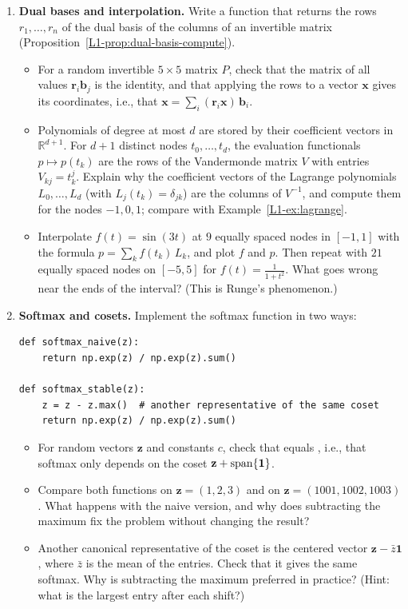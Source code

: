 \begin{enumerate}[label=\textbf{P\arabic*.}, leftmargin=*]
    \item \homework{} \textbf{Dual bases and interpolation.} Write a function  that returns the rows $r_1, \ldots, r_n$ of the dual basis of the columns of an invertible matrix  (Proposition~\ref{L1-prop:dual-basis-compute}).
    \begin{itemize}
        \item For a random invertible $5 \times 5$ matrix $P$, check that the matrix of all values $\mathbf{r}_i \mathbf{b}_j$ is the identity, and that applying the rows to a vector $\mathbf{x}$ gives its coordinates, i.e., that $\mathbf{x} = \sum_i (\mathbf{r}_i \mathbf{x})\, \mathbf{b}_i$.
        \item Polynomials of degree at most $d$ are stored by their coefficient vectors in $\mathbb{R}^{d+1}$. For $d + 1$ distinct nodes $t_0, \ldots, t_d$, the evaluation functionals $p \mapsto p(t_k)$ are the rows of the Vandermonde matrix $V$ with entries $V_{kj} = t_k^j$. Explain why the coefficient vectors of the Lagrange polynomials $L_0, \ldots, L_d$ (with $L_j(t_k) = \delta_{jk}$) are the columns of $V^{-1}$, and compute them for the nodes $-1, 0, 1$; compare with Example~\ref{L1-ex:lagrange}.
        \item Interpolate $f(t) = \sin(3t)$ at $9$ equally spaced nodes in $[-1, 1]$ with the formula $p = \sum_k f(t_k)\, L_k$, and plot $f$ and $p$. Then repeat with $21$ equally spaced nodes on $[-5, 5]$ for $f(t) = \frac{1}{1 + t^2}$. What goes wrong near the ends of the interval? (This is Runge's phenomenon.)
    \end{itemize}

    \item \textbf{Softmax and cosets.} Implement the softmax function in two ways:
\begin{lstlisting}
def softmax_naive(z):
    return np.exp(z) / np.exp(z).sum()

def softmax_stable(z):
    z = z - z.max()  # another representative of the same coset
    return np.exp(z) / np.exp(z).sum()
\end{lstlisting}
    \begin{itemize}
        \item For random vectors $\mathbf{z}$ and constants $c$, check that  equals , i.e., that softmax only depends on the coset $\mathbf{z} + \operatorname{span}\{\mathbf{1}\}$.
        \item Compare both functions on $\mathbf{z} = (1, 2, 3)$ and on $\mathbf{z} = (1001, 1002, 1003)$. What happens with the naive version, and why does subtracting the maximum fix the problem without changing the result?
        \item Another canonical representative of the coset is the centered vector $\mathbf{z} - \bar{z}\mathbf{1}$, where $\bar{z}$ is the mean of the entries. Check that it gives the same softmax. Why is subtracting the maximum preferred in practice? (Hint: what is the largest entry after each shift?)
    \end{itemize}


\end{enumerate}
